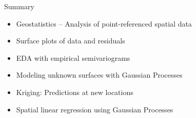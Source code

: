 
\begin{frame}{Summary}
\begin{itemize}
\item Geostatistics -- Analysis of point-referenced spatial data
\item Surface plots of data and residuals
\item EDA with empirical semivariograms
\item Modeling unknown surfaces with Gaussian Processes
\item Kriging: Predictions at new locations
\item Spatial linear regression using Gaussian Processes
\end{itemize}
\end{frame}


